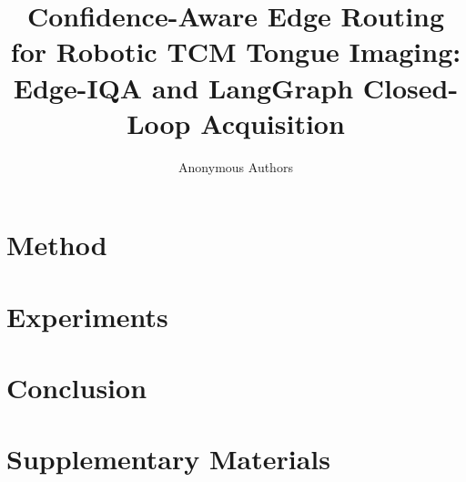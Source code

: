 \documentclass[11pt,twocolumn]{article}
\title{Confidence-Aware Edge Routing for Robotic TCM Tongue Imaging:\\
Edge-IQA and LangGraph Closed-Loop Acquisition}
\author{Anonymous Authors}
\date{}
\begin{document}
\maketitle





\section{Method}
\label{sec:method}





\section{Experiments}
\label{sec:experiments}














\section{Conclusion}





\appendix
\section{Supplementary Materials}
\label{sec:supp}


\end{document}
